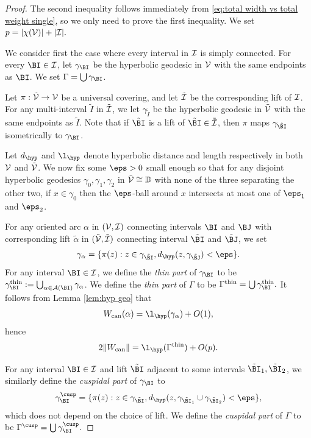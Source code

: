 \documentclass[12pt]{amsart}
\begin{document}
\begin{proof}
	The second inequality follows immediately from \eqref{eq:total width vs total weight single}, so we only need to prove the first inequality. We  set $p = |\chi(\mathcal V)|+ |\mathcal I|.$ 
	
	We consider first the case where every interval in $\mathcal I$ is simply connected.
	For every $\BI\in \II$, let $\gamma_\BI$ be the hyperbolic geodesic in $\mathcal V$ with the same endpoints as $\BI$.
	We set $\Gamma = \bigcup \gamma_\BI$.
	
	Let $\pi: \tilde {\mathcal V}\to \mathcal V$ be a universal covering, and let $\tilde {\mathcal I}$ be the corresponding lift of $\mathcal I$.  For any multi-interval $\tilde I$ in $\tilde {\mathcal I}$, we let $\gamma_{\tilde I}$ be the hyperbolic geodesic in $\tilde {\mathcal V}$ with the same endpoints as $\tilde I$. Note that if $\tilde \BI$ is a lift of  $\tilde \BI\in \tilde \II$, then $\pi$ maps $\gamma_{\tilde \BI}$ isometrically to $\gamma_\BI$.
	
	
	Let $d_\hyp$ and $\l_\hyp$ denote hyperbolic distance and length respectively  in both $\mathcal V$ and $\tilde {\mathcal V}$. 
	We now fix some $\eps>0$ small enough so that for any disjoint hyperbolic geodesics $\gamma_0, \gamma_1, \gamma_2$ in $\tilde {\mathcal V} \cong \mathbb D$ with none of the three separating the other two, if $x\in \gamma_0$ then the $\eps$-ball around $x$ intersects at most one of $\eps_1$ and $\eps_2$.
	
	
	For any oriented arc $\alpha$ in $(\mathcal V, \mathcal I)$ connecting intervals $\BI$ and $\BJ$ with corresponding lift $\tilde\alpha$ in $(\tilde {\mathcal V}, \tilde {\mathcal I})$ connecting interval $\tilde \BI$ and $\tilde \BJ$, we set 
	\begin{equation*}
		\gamma_{\alpha}= \{\pi(z): z\in\gamma_{\tilde \BI}, d_\hyp(z, \gamma_{\tilde{\BJ}})< \eps\}.
	\end{equation*}
	For any interval $\BI\in \II$, we define the \textit{thin part} of $\gamma_\BI$ to be $\gamma_\BI^\thin:= \bigcup_{\alpha\in \AA(\BI)} \gamma_\alpha$.	
	We define the \textit{thin part} of $\Gamma$ to be $\Gamma^\thin= \bigcup\gamma_\BI^\thin.$
	It follows from Lemma \ref{lem:hyp geo} that 
	$$\wcan(\alpha) = \l_\hyp(\gamma_\alpha)+O(1),$$
	hence 
	\begin{equation}\label{eq:thin part}
		2\|\wcan\|= \l_\hyp(\Gamma^\thin)+O(p).
	\end{equation}
	
	For any interval $\BI\in \II$ and lift $\tilde \BI$ adjacent to some intervals $\tilde \BI_1, \tilde\BI_2$, we similarly define the \textit{cuspidal part} of $\gamma_\BI$ to 
	\begin{equation*}
		\gamma_{\BI}^\cusp = \{\pi(z): z\in\gamma_{\tilde \BI}, d_\hyp(z, \gamma_{\tilde{\BI}_1}\cup \gamma_{\tilde \BI_2})< \eps\},
	\end{equation*}
	which does not depend on the choice of lift. 
	We define the \textit{cuspidal part} of $\Gamma$ to be $\Gamma^\cusp= \bigcup \gamma_\BI^\cusp.$
	

\end{proof}
\end{document}
